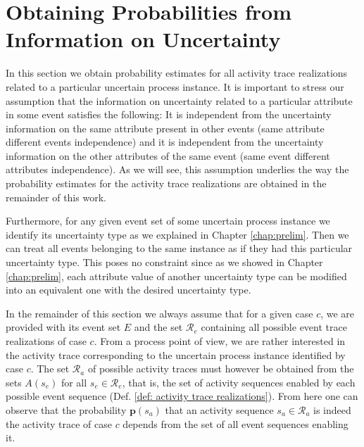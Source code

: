 \section{Obtaining Probabilities from Information on Uncertainty}
In this section we obtain probability estimates for all activity trace realizations related to a particular uncertain process instance.
It is important to stress our assumption that the information on uncertainty related to a particular attribute in some event satisfies the following:
It is independent from the uncertainty information on the same attribute present in other events (same attribute different events independence) and it is independent from the uncertainty information on the other attributes of the same event (same event different attributes independence).
As we will see, this assumption underlies the way the probability estimates for the activity trace realizations are obtained in the remainder of this work.

Furthermore, for any given event set of some uncertain process instance we identify its uncertainty type as we explained in Chapter \ref{chap:prelim}.
Then we can treat all events belonging to the same instance as if they had this particular uncertainty type.
This poses no constraint since as we showed in Chapter \ref{chap:prelim}, each attribute value of another uncertainty type can be modified into an equivalent one with the desired uncertainty type.

In the remainder of this section we always assume that for a given case $c$, we are provided with its event set $E$ and the set $\mathcal{R}_e$ containing all possible event trace realizations of case $c$.
From a process point of view, we are rather interested in the activity trace corresponding to the uncertain process instance identified by case $c$.
The set $\mathcal{R}_a$ of possible activity traces must however be obtained from the sets $A(s_e)$ for all $s_e \in \mathcal{R}_e$, that is, the set of activity sequences enabled by each possible event sequence (Def. \ref{def: activity trace realizations}).
From here one can observe that the probability $\textbf{p}(s_a)$ that an activity sequence $s_a \in \mathcal{R}_a$ is indeed the activity trace of case $c$ depends from the set of all event sequences enabling it.

